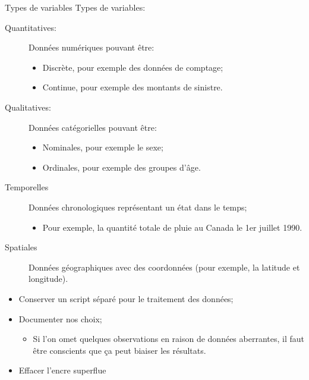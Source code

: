 \documentclass[10pt, french]{article}
\begin{document}
\begin{multicols*}{3}
\begin{conceptgen}{Types de variables}
Types de variables:
\begin{description}
	\item[Quantitatives:]	Données numériques pouvant être:
		\begin{itemize}[leftmargin = *]
		\item	Discrète, pour exemple des données de comptage; 
		\item	Continue, pour exemple des montants de sinistre.
		\end{itemize}
	\item[Qualitatives:]	Données catégorielles pouvant être:
		\begin{itemize}[leftmargin = *]
		\item	Nominales, pour exemple le sexe; 
		\item	Ordinales, pour exemple des groupes d'âge.
		\end{itemize}
	\item[Temporelles]Données chronologiques représentant un état dans le temps;
		\begin{itemize}[leftmargin = *]
		\item	Pour exemple, la quantité totale de pluie au Canada le 1er juillet 1990.
		\end{itemize}
	\item[Spatiales]	Données géographiques avec des coordonnées (pour exemple, la latitude et longitude).
\end{description}
\end{conceptgen}

\begin{algo2}[Conseils]
\begin{itemize}[leftmargin = *]
	\item	Conserver un script séparé pour le traitement des données;
	\item	Documenter nos choix;
		\begin{itemize}[leftmargin = *]
		\item	Si l'on omet quelques observations en raison de données aberrantes, il faut être conscients que ça peut biaiser les résultats.
		\end{itemize}
	\item	Effacer l'encre superflue 
	

\end{itemize}
\end{algo2}
\end{multicols*}
\end{document}
